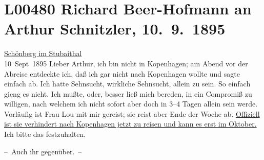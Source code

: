 

\section[Richard Beer-Hofmann an Arthur Schnitzler, 10. 9. 1895]{L00480 Richard Beer-Hofmann an Arthur Schnitzler, 10. 9. 1895}
\nopagebreak{}
\rehead{ }\normalsize\beginnumbering{}
\toendnotes[C]{\smallbreak\pagebreak[2]}
\pstart
           \raggedleft{}{\pb}\uline{Schönberg im Stubaithal}{\\}10 Sept 1895\pend
           \vspace{0.5em}
\pstart
           Lieber Arthur, ich bin nicht in Kopenhagen; am Abend vor der Abreise entdeckte ich, daß ich gar nicht nach
                  Kopenhagen wollte und sagte einfach ab. Ich
               hatte Sehnsucht, wirkliche Sehnsucht, allein zu sein. So einfach gieng es nicht. Ich
               mußte, oder, besser ließ mich bereden, in ein Compromiß zu willigen,  nach welchem ich nicht sofort aber doch in 3–4
               Tagen allein sein werde. Vorläufig ist {\pb}Frau Lou mit mir gereist; sie reist aber Ende der Woche ab. \uline{Offiziell ist sie verhindert nach Kopenhagen jetzt zu reisen und kann es erst im Oktober.}
               Ich bitte das festzuhalten.\pend
           
\pstart
           – Auch ihr gegenüber. –\pend
           
